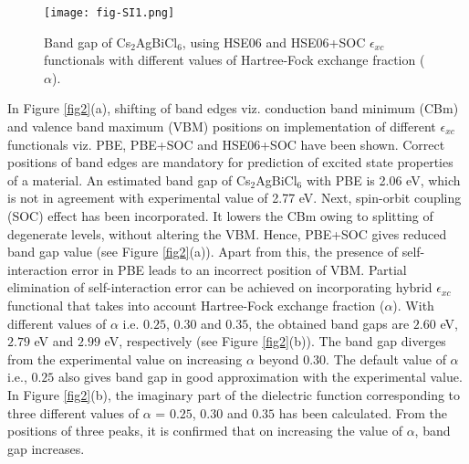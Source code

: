 \documentclass[journal=jpclcd,manuscript=letter]{achemso}
\begin{document}
\begin{figure}[H]
	\centering
	\texttt{[image: fig-SI1.png]}
	\caption{Band gap of Cs$_2$AgBiCl$_6$, using HSE06 and HSE06+SOC $\epsilon_{xc}$ functionals with different values of Hartree-Fock exchange fraction ($\alpha$).}
	\label{fig1}
\end{figure}
In Figure \ref{fig2}(a), shifting of band edges viz. conduction band minimum (CBm) and valence band maximum (VBM) positions on implementation of different $\epsilon_{xc}$ functionals viz. PBE, PBE+SOC and HSE06+SOC have been shown. Correct positions of band edges are mandatory for prediction of excited state properties of a material. An estimated band gap of Cs$_2$AgBiCl$_6$ with PBE is 2.06 eV, which is not in agreement with experimental value of 2.77 eV. Next, spin-orbit coupling (SOC) effect has been incorporated. It lowers the CBm owing to splitting of degenerate levels, without altering the VBM. Hence, PBE+SOC gives reduced band gap value (see Figure \ref{fig2}(a)). Apart from this, the presence of self-interaction error in PBE leads to an incorrect position of VBM. Partial elimination of self-interaction error can be achieved on incorporating hybrid $\epsilon_{xc}$ functional that takes into account Hartree-Fock exchange fraction ($\alpha$). With different values of $\alpha$ i.e. $0.25$, $0.30$ and $0.35$, the obtained band gaps are $2.60$ eV, $2.79$ eV and $2.99$ eV, respectively (see Figure \ref{fig2}(b)). The band gap diverges from the experimental value on increasing $\alpha$ beyond $0.30$. The default value of $\alpha$ i.e., $0.25$ also gives band gap in good approximation with the experimental value. In Figure \ref{fig2}(b), the imaginary part of the dielectric function corresponding to three different values of $\alpha$ = $0.25$, $0.30$ and $0.35$ has been calculated.  From the positions of three peaks, it is confirmed that on increasing the value of $\alpha$, band gap increases.
\end{document}
